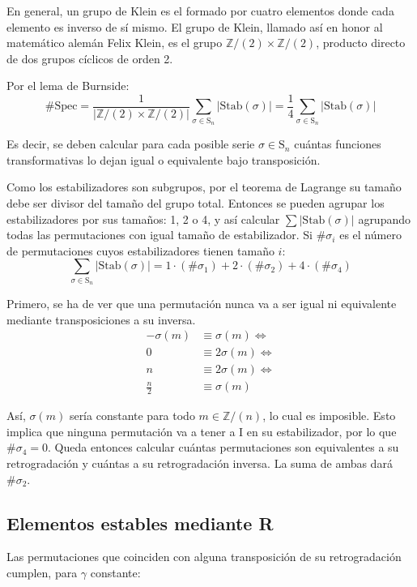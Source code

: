 		En general, un grupo de Klein es el formado por cuatro elementos donde cada elemento es inverso de sí mismo. El grupo de Klein, llamado así en honor al matemático alemán Felix Klein, es el grupo $\mathbb{Z}/(2)\times\mathbb{Z}/(2)$, producto directo de dos grupos cíclicos de orden 2.
		
		Por el lema de Burnside:	
		\[\#\text{Spec}=\frac{1}{|\mathbb{Z}/(2)\times\mathbb{Z}/(2)|}\sum_{\sigma\in\text{S}_n}|\text{Stab}(\sigma)|=\frac{1}{4}\sum_{\sigma\in\text{S}_n}|\text{Stab}(\sigma)|\]
		
		Es decir, se deben calcular para cada posible serie $\sigma\in\text{S}_n$ cuántas funciones transformativas lo dejan igual o equivalente bajo transposición.
		
		Como los estabilizadores son subgrupos, por el teorema de Lagrange su tamaño debe ser divisor del tamaño del grupo total. Entonces se pueden agrupar los estabilizadores por sus tamaños: 1, 2 o 4, y así calcular $\sum|\text{Stab}(\sigma)|$ agrupando todas las permutaciones con igual tamaño de estabilizador. Si $\#\sigma_i$ es el número de permutaciones cuyos estabilizadores tienen tamaño $i$:		
		\[\sum_{\sigma\in\text{S}_n}|\text{Stab}(\sigma)|=1\cdot(\#\sigma_1)+2\cdot(\#\sigma_2)+4\cdot(\#\sigma_4)\]
	
		Primero, se ha de ver que una permutación nunca va a ser igual ni equivalente mediante transposiciones a su inversa.	\label{inversano}
			\begin{align*}
			-\sigma(m)&\equiv\sigma(m)\Longleftrightarrow\\
			0&\equiv2\sigma(m)\Longleftrightarrow\\
			n&\equiv2\sigma(m)\Longleftrightarrow\\
			\frac{n}{2}&\equiv\sigma(m)
			\end{align*}
		
		Así, $\sigma(m)$ sería constante para todo $m\in \mathbb{Z} / (n)$, lo cual es imposible. Esto implica que ninguna permutación va a tener a I en su estabilizador, por lo que $\#\sigma_4=0$. Queda entonces calcular cuántas permutaciones son equivalentes a su retrogradación y cuántas a su retrogradación inversa. La suma de ambas dará $\#\sigma_2$.
	
	\subsection{Elementos estables mediante R}
		Las permutaciones que coinciden con alguna transposición de su retrogradación cumplen, para $\gamma$ constante:
		
